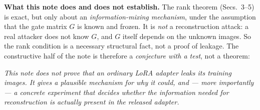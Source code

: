 %
%


\begin{revbox}
\textbf{What this note does and does not establish.}
The rank theorem (Secs.~3--5) is exact, but only about an \emph{information-mixing
mechanism}, under the assumption that the gate matrix $G$ is known and frozen. It is
\emph{not} a reconstruction attack: a real attacker does not know $G$, and $G$ itself
depends on the unknown images. So the rank condition is a necessary structural fact,
not a proof of leakage. The constructive half of the note is therefore a
\emph{conjecture with a test}, not a theorem:
\begin{center}\itshape
This note does not prove that an ordinary LoRA adapter leaks its training images.
It gives a plausible mechanism for why it could, and --- more importantly --- a
concrete experiment that decides whether the information needed for reconstruction is
actually present in the released adapter.
\end{center}
\end{revbox}


